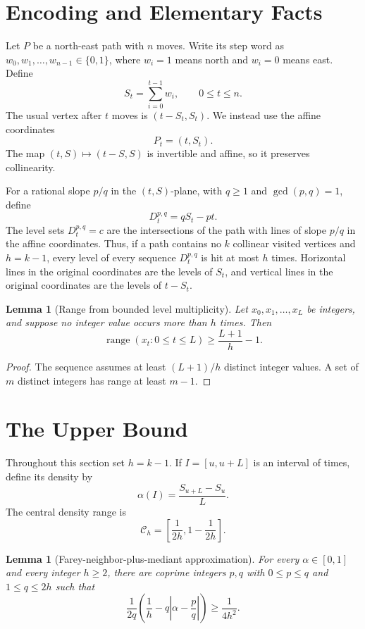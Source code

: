 \documentclass[11pt]{article}
\newtheorem{lemma}[theorem]{Lemma}
\theoremstyle{definition}
\theoremstyle{remark}
\newcommand{\range}{\operatorname{range}}
\newcommand{\1}{\mathbf 1}
\begin{document}
\section{Encoding and Elementary Facts}\label{sec:encoding}

Let $P$ be a north-east path with $n$ moves. Write its step word as $w_0,w_1,\ldots,w_{n-1}\in\{0,1\}$, where $w_i=1$ means north and $w_i=0$ means east. Define
\[
S_t=\sum_{i=0}^{t-1}w_i,\qquad 0\le t\le n.
\]
The usual vertex after $t$ moves is $(t-S_t,S_t)$. We instead use the affine coordinates
\[
P_t=(t,S_t).
\]
The map $(t,S)\mapsto(t-S,S)$ is invertible and affine, so it preserves collinearity.

\bigskip
\noindent
For a rational slope $p/q$ in the $(t,S)$-plane, with $q\ge1$ and $\gcd(p,q)=1$, define
\[
D_t^{p,q}=qS_t-pt.
\]
The level sets $D_t^{p,q}=c$ are the intersections of the path with lines of slope $p/q$ in the affine coordinates. Thus, if a path contains no $k$ collinear visited vertices and $h=k-1$, every level of every sequence $D_t^{p,q}$ is hit at most $h$ times. Horizontal lines in the original coordinates are the levels of $S_t$, and vertical lines in the original coordinates are the levels of $t-S_t$.

\begin{lemma}[Range from bounded level multiplicity]\label{lem:range}
Let $x_0,x_1,\ldots,x_L$ be integers, and suppose no integer value occurs more than $h$ times. Then
\[
\range(x_t:0\le t\le L)\ge \frac{L+1}{h}-1.
\]
\end{lemma}

\begin{proof}
The sequence assumes at least $(L+1)/h$ distinct integer values. A set of $m$ distinct integers has range at least $m-1$.
\end{proof}

\section{The Upper Bound}\label{sec:upper}

Throughout this section set $h=k-1$. If $I=[u,u+L]$ is an interval of times, define its density by
\[
\alpha(I)=\frac{S_{u+L}-S_u}{L}.
\]
The central density range is
\[
\mathcal C_h=\left[\frac1{2h},1-\frac1{2h}\right].
\]

\begin{lemma}[Farey-neighbor-plus-mediant approximation]\label{lem:farey_mediant}
For every $\alpha\in[0,1]$ and every integer $h\ge2$, there are coprime integers $p,q$ with $0\le p\le q$ and $1\le q\le2h$ such that
\[
\frac1{2q}\left(\frac1h-q\left|\alpha-\frac pq\right|\right)
\ge \frac1{4h^2}.
\]
\end{lemma}
\end{document}
